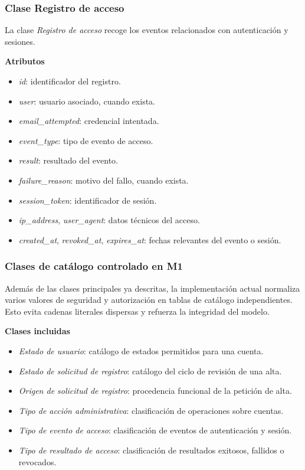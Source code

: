 \subsubsection{Clase Registro de acceso}

La clase \textit{Registro de acceso} recoge los eventos relacionados con autenticación y sesiones.

\textbf{Atributos}

\begin{itemize}
      \item \textit{id}: identificador del registro.
      \item \textit{user}: usuario asociado, cuando exista.
      \item \textit{email\_attempted}: credencial intentada.
      \item \textit{event\_type}: tipo de evento de acceso.
      \item \textit{result}: resultado del evento.
      \item \textit{failure\_reason}: motivo del fallo, cuando exista.
      \item \textit{session\_token}: identificador de sesión.
      \item \textit{ip\_address}, \textit{user\_agent}: datos técnicos del acceso.
      \item \textit{created\_at}, \textit{revoked\_at}, \textit{expires\_at}: fechas relevantes del evento o sesión.
\end{itemize}

\subsubsection{Clases de catálogo controlado en M1}

Además de las clases principales ya descritas, la implementación actual normaliza varios valores de seguridad y autorización en tablas de catálogo independientes. Esto evita cadenas literales dispersas y refuerza la integridad del modelo.

\textbf{Clases incluidas}

\begin{itemize}
      \item \textit{Estado de usuario}: catálogo de estados permitidos para una cuenta.
      \item \textit{Estado de solicitud de registro}: catálogo del ciclo de revisión de una alta.
      \item \textit{Origen de solicitud de registro}: procedencia funcional de la petición de alta.
      \item \textit{Tipo de acción administrativa}: clasificación de operaciones sobre cuentas.
      \item \textit{Tipo de evento de acceso}: clasificación de eventos de autenticación y sesión.
      \item \textit{Tipo de resultado de acceso}: clasificación de resultados exitosos, fallidos o revocados.
\end{itemize}


